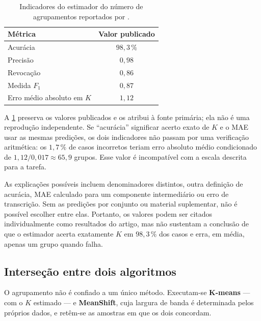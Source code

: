 \begin{table}[htbp]
\centering
\caption{Indicadores do estimador do número de agrupamentos reportados por
\citet{Lopes2025EAAI}.}
\label{tab:aberto-rf}
\begin{tabular}{lc}
\toprule
\textbf{Métrica} & \textbf{Valor publicado} \\
\midrule
Acurácia                   & $98{,}3\,\%$ \\
Precisão                   & $0{,}98$ \\
Revocação                  & $0{,}86$ \\
Medida $F_1$               & $0{,}87$ \\
Erro médio absoluto em $K$ & $1{,}12$ \\
\bottomrule
\end{tabular}
\end{table}

\begin{destaque}
A \cref{tab:aberto-rf} preserva os valores publicados e os atribui à fonte primária;
ela não é uma reprodução independente. Se ``acurácia'' significar acerto exato de $K$
e o MAE usar as mesmas predições, os dois indicadores não passam por uma verificação
aritmética: os $1{,}7\,\%$ de casos incorretos teriam erro absoluto médio condicionado de
$1{,}12/0{,}017\approx65{,}9$ grupos. Esse valor é incompatível com a escala descrita
para a tarefa.

As explicações possíveis incluem denominadores distintos, outra definição de acurácia,
MAE calculado para um componente intermediário ou erro de transcrição. Sem as predições
por conjunto ou material suplementar, não é possível escolher entre elas. Portanto, os
valores podem ser citados individualmente como resultados do artigo, mas não sustentam
a conclusão de que o estimador acerta exatamente $K$ em $98{,}3\,\%$ dos casos e erra,
em média, apenas um grupo quando falha.
\end{destaque}

\subsection{Interseção entre dois algoritmos}

O agrupamento não é confiado a um único método. Executam-se \textbf{K-means} --- com o
$K$ estimado --- e \textbf{MeanShift}, cuja largura de banda é determinada pelos próprios
dados, e retêm-se as amostras em que os dois concordam.

